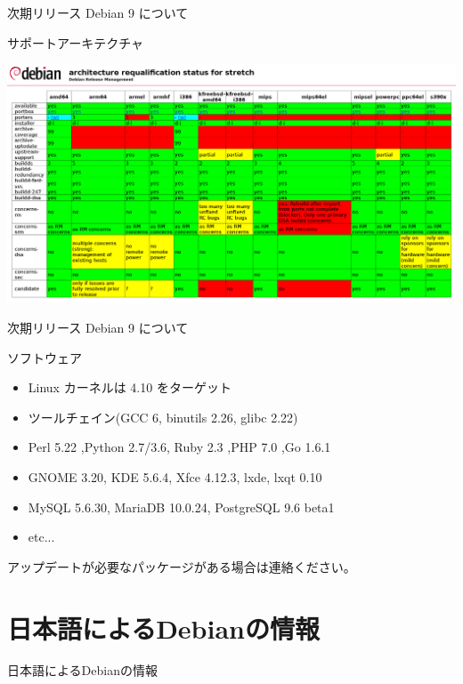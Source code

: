 \begin{frame}{次期リリース Debian 9 について}%

サポートアーキテクチャ
 \begin{center}
 \includegraphics[width=0.8\hsize]{image201606/stretch-arch-requalification.png}
 \end{center}

\end{frame}



\begin{frame}{次期リリース Debian 9 について}%

ソフトウェア
\begin{itemize}
\item Linux カーネルは 4.10 をターゲット
\item ツールチェイン(GCC 6, binutils 2.26, glibc 2.22)
\item Perl 5.22 ,Python 2.7/3.6, Ruby 2.3 ,PHP 7.0 ,Go 1.6.1
\item GNOME 3.20, KDE 5.6.4, Xfce 4.12.3, lxde, lxqt 0.10
\item MySQL 5.6.30, MariaDB 10.0.24, PostgreSQL 9.6 beta1
\item etc...
\end{itemize}

アップデートが必要なパッケージがある場合は連絡ください。

\end{frame}

\section{日本語によるDebianの情報}
\begin{frame}\begin{center}\Huge{日本語によるDebianの情報}\end{center}\end{frame}

